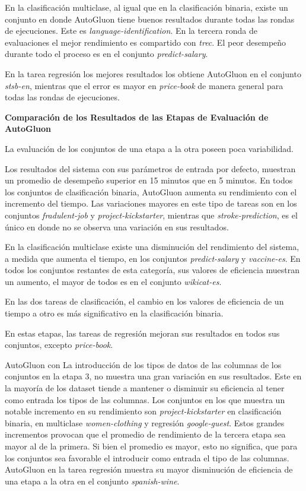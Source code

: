 En la clasificación multiclase, al igual que en la clasificación binaria, existe un conjunto en donde AutoGluon tiene buenos resultados durante todas las rondas de 
ejecuciones. Este es \textit{language-identification}. En la tercera ronda de evaluaciones el mejor rendimiento es compartido con \textit{trec}. El peor desempeño 
durante todo el proceso es en el conjunto \textit{predict-salary}.

En la tarea regresión los mejores resultados los obtiene AutoGluon en el conjunto \textit{stsb-en}, mientras que el error es mayor en \textit{price-book} de manera 
general para todas las rondas de ejecuciones.


\begin{flushleft} 
  {\large { \textbf{Comparación de los Resultados de las Etapas de Evaluación de AutoGluon}}}\label{results:comparation}
\end{flushleft}


La evaluación de los conjuntos de una etapa a la otra poseen poca variabilidad.  

Los resultados del sistema con sus parámetros de entrada por defecto, muestran un promedio de desempeño superior en 15 minutos que en 5 minutos. 
En todos los conjuntos de clasificación binaria, AutoGluon aumenta su rendimiento con el incremento del tiempo. 
Las variaciones mayores en este tipo de tareas son en los conjuntos \textit{fradulent-job} y \textit{project-kickstarter}, mientras que \textit{stroke-prediction}, 
es el único en donde no se observa una variación en sus resultados.

En la clasificación multiclase existe una disminución del rendimiento del sistema, a medida que aumenta el tiempo, en los conjuntos \textit{predict-salary} y 
\textit{vaccine-es}. En todos los conjuntos restantes de esta categoría, sus valores de eficiencia muestran un aumento, el mayor de todos es en el 
conjunto \textit{wikicat-es}.

En las dos tareas de clasificación, el cambio en los valores de eficiencia de un tiempo a otro es más significativo en la clasificación binaria.

En estas etapas, las tareas de regresión  mejoran sus resultados en todos sus conjuntos, excepto \textit{price-book}.

AutoGluon con La introducción de los tipos de datos de las columnas de los conjuntos en la etapa 3, no muestra una gran variación en sus resultados.
Este en la mayoría de los dataset tiende a mantener o disminuir su eficiencia al tener como entrada los tipos de las columnas. Los conjuntos en los que muestra un 
notable incremento en su rendimiento son \textit{project-kickstarter} en clasificación binaria, en multiclase \textit{women-clothing} y regresión 
\textit{google-guest}. Estos grandes incrementos provocan que el promedio de rendimiento de la tercera etapa sea mayor al de la primera. Si bien el promedio es mayor, 
esto no significa, que para los conjuntos sea favorable el introducir como entrada el tipo de las columnas. 
AutoGluon en la tarea regresión muestra su mayor disminución de eficiencia de una etapa a la otra en el conjunto \textit{spanish-wine}.


